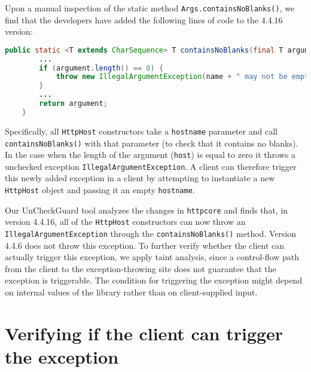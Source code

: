 
Upon a manual inspection of the static method \texttt{Args.containsNoBlanks()}, we find that the developers have added the following lines of code to the 4.4.16 version:

\begin{lstlisting}[language=Java]
  public static <T extends CharSequence> T containsNoBlanks(final T argument, final String name) {
        ...
        if (argument.length() == 0) {
            throw new IllegalArgumentException(name + " may not be empty");
        }
        ...
        return argument;
    }
\end{lstlisting}

Specifically, all \texttt{HttpHost} constructors take a \texttt{hostname} parameter and call \texttt{containsNoBlanks()}
with that parameter (to check that it contains no blanks). In the case when the length of the argument (\texttt{host}) is equal to zero it throws a unchecked exception \texttt{IllegalArgumentException}. A client can therefore trigger this newly added exception
in a client by attempting to instantiate a new \texttt{HttpHost} object and passing it an empty
\texttt{hostname}.

Our UnCheckGuard tool analyzes the changes in \texttt{httpcore} and finds that, in version 4.4.16, all of the \texttt{HttpHost} constructors can now throw an \texttt{IllegalArgumentException} through the \texttt{containsNoBlanks()} method. Version 4.4.6 does not throw this exception. To further verify whether the client can actually trigger this exception, we apply taint analysis, since a control-flow path from the client to the exception-throwing site does not guarantee that the exception is triggerable. The condition for triggering the exception might depend on internal values of the library rather than on client-supplied input.

\section{Verifying if the client can trigger the exception}


